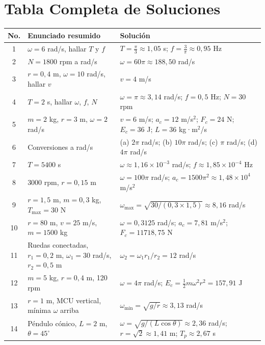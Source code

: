 \documentclass[12pt]{article}
\begin{document}
\section*{Tabla Completa de Soluciones}
\small
\begin{longtable}{c p{5.5cm} p{9cm}}
\toprule
\textbf{No.} & \textbf{Enunciado resumido} & \textbf{Solución} \\
\midrule
\endhead
1  & \(\omega = 6\) rad/s, hallar \(T\) y \(f\) &
  \(T = \frac{\pi}{3} \approx 1{,}05\) s; \(f = \frac{3}{\pi} \approx 0{,}95\) Hz \\
2  & \(N = 1800\) rpm a rad/s &
  \(\omega = 60\pi \approx 188{,}50\) rad/s \\
3  & \(r = 0{,}4\) m, \(\omega = 10\) rad/s, hallar \(v\) &
  \(v = 4\) m/s \\
4  & \(T = 2\) s, hallar \(\omega\), \(f\), \(N\) &
  \(\omega = \pi \approx 3{,}14\) rad/s; \(f = 0{,}5\) Hz; \(N = 30\) rpm \\
5  & \(m = 2\) kg, \(r = 3\) m, \(\omega = 2\) rad/s &
  \(v = 6\) m/s; \(a_c = 12\) m/s\(^2\); \(F_c = 24\) N; \(E_c = 36\) J; \(L = 36\) kg·m\(^2\)/s \\
6  & Conversiones a rad/s &
  (a) \(2\pi\) rad/s; (b) \(10\pi\) rad/s; (c) \(\pi\) rad/s; (d) \(4\pi\) rad/s \\
7  & \(T = 5400\) s &
  \(\omega \approx 1{,}16 \times 10^{-3}\) rad/s; \(f \approx 1{,}85 \times 10^{-4}\) Hz \\
8  & 3000 rpm, \(r = 0{,}15\) m &
  \(\omega = 100\pi\) rad/s; \(a_c = 1500\pi^2 \approx 1{,}48 \times 10^4\) m/s\(^2\) \\
\midrule
9  & \(r = 1{,}5\) m, \(m = 0{,}3\) kg, \(T_{\max} = 30\) N &
  \(\omega_{\max} = \sqrt{30/(0{,}3 \times 1{,}5)} \approx 8{,}16\) rad/s \\
10 & \(r = 80\) m, \(v = 25\) m/s, \(m = 1500\) kg &
  \(\omega = 0{,}3125\) rad/s; \(a_c = 7{,}81\) m/s\(^2\); \(F_c = 11718{,}75\) N \\
11 & Ruedas conectadas, \(r_1 = 0{,}2\) m, \(\omega_1 = 30\) rad/s, \(r_2 = 0{,}5\) m &
  \(\omega_2 = \omega_1 r_1 / r_2 = 12\) rad/s \\
12 & \(m = 5\) kg, \(r = 0{,}4\) m, 120 rpm &
  \(\omega = 4\pi\) rad/s; \(E_c = \frac{1}{2} m \omega^2 r^2 = 157{,}91\) J \\
13 & \(r = 1\) m, MCU vertical, mínima \(\omega\) arriba &
  \(\omega_{\min} = \sqrt{g/r} \approx 3{,}13\) rad/s \\
14 & Péndulo cónico, \(L = 2\) m, \(\theta = 45^\circ\) &
  \(\omega = \sqrt{g/(L\cos\theta)} \approx 2{,}36\) rad/s; \(r = \sqrt{2} \approx 1{,}41\) m; \(T_p \approx 2{,}67\) s \\

\end{longtable}
\end{document}
